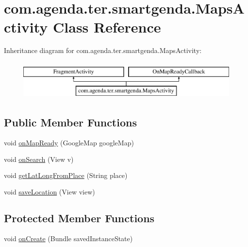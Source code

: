 \hypertarget{classcom_1_1agenda_1_1ter_1_1smartgenda_1_1_maps_activity}{\section{com.\-agenda.\-ter.\-smartgenda.\-Maps\-Activity Class Reference}
\label{classcom_1_1agenda_1_1ter_1_1smartgenda_1_1_maps_activity}
}
Inheritance diagram for com.\-agenda.\-ter.\-smartgenda.\-Maps\-Activity\-:\begin{figure}[H]
\begin{center}
\leavevmode
\includegraphics[height=2.000000cm]{classcom_1_1agenda_1_1ter_1_1smartgenda_1_1_maps_activity}
\end{center}
\end{figure}
\subsection*{Public Member Functions}
\begin{DoxyCompactItemize}
\item 
void \hyperlink{classcom_1_1agenda_1_1ter_1_1smartgenda_1_1_maps_activity_abbe86b58869768affdd16d988a50498b}{on\-Map\-Ready} (Google\-Map google\-Map)
\item 
void \hyperlink{classcom_1_1agenda_1_1ter_1_1smartgenda_1_1_maps_activity_a3f6655e5e4f777d2df3fce911b1218bd}{on\-Search} (View v)
\item 
void \hyperlink{classcom_1_1agenda_1_1ter_1_1smartgenda_1_1_maps_activity_a47f43dd78cbd1e5435e4ac39a160488a}{get\-Lat\-Long\-From\-Place} (String place)
\item 
void \hyperlink{classcom_1_1agenda_1_1ter_1_1smartgenda_1_1_maps_activity_a25f7995b43820a0608a689ce977d068b}{save\-Location} (View view)
\end{DoxyCompactItemize}
\subsection*{Protected Member Functions}
\begin{DoxyCompactItemize}
\item 
void \hyperlink{classcom_1_1agenda_1_1ter_1_1smartgenda_1_1_maps_activity_a518d6ee283a159fce292d33110aff4dd}{on\-Create} (Bundle saved\-Instance\-State)
\end{DoxyCompactItemize}


